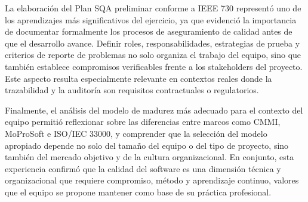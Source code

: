 \documentclass{article}
\begin{document}
La elaboración del Plan SQA preliminar conforme a IEEE 730 representó uno de los aprendizajes más significativos del ejercicio, ya que evidenció la importancia de documentar formalmente los procesos de aseguramiento de calidad antes de que el desarrollo avance. Definir roles, responsabilidades, estrategias de prueba y criterios de reporte de problemas no solo organiza el trabajo del equipo, sino que también establece compromisos verificables frente a los stakeholders del proyecto. Este aspecto resulta especialmente relevante en contextos reales donde la trazabilidad y la auditoría son requisitos contractuales o regulatorios.

Finalmente, el análisis del modelo de madurez más adecuado para el contexto del equipo permitió reflexionar sobre las diferencias entre marcos como CMMI, MoProSoft e ISO/IEC 33000, y comprender que la selección del modelo apropiado depende no solo del tamaño del equipo o del tipo de proyecto, sino también del mercado objetivo y de la cultura organizacional. En conjunto, esta experiencia confirmó que la calidad del software es una dimensión técnica y organizacional que requiere compromiso, método y aprendizaje continuo, valores que el equipo se propone mantener como base de su práctica profesional.
\end{document}
